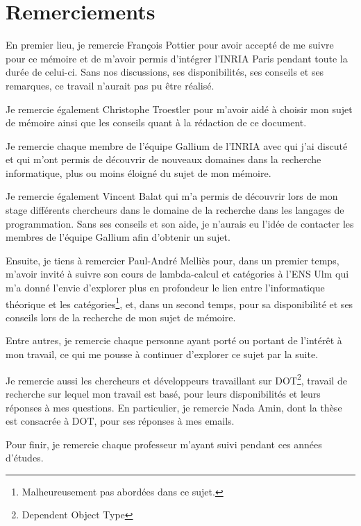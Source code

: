 \chapter*{Remerciements}

En premier lieu, je remercie François Pottier pour avoir accepté de me suivre
pour ce mémoire et de m'avoir permis d'intégrer l'INRIA Paris pendant toute la
durée de celui-ci. Sans nos discussions, ses disponibilités, ses conseils et ses
remarques, ce travail n'aurait pas pu être réalisé.

Je remercie également Christophe Troestler pour m'avoir aidé à choisir mon sujet
de mémoire ainsi que les conseils quant à la rédaction de ce document.

Je remercie chaque membre de l'équipe Gallium de
l'INRIA avec qui j'ai discuté et qui m'ont permis de découvrir de nouveaux
domaines dans la recherche informatique, plus ou moins éloigné du sujet de mon mémoire.

Je remercie également Vincent Balat qui m'a permis de découvrir lors de mon
stage différents chercheurs dans le domaine de la recherche dans les langages de
programmation. Sans ses conseils et son aide, je n'aurais eu l'idée de contacter
les membres de l'équipe Gallium afin d'obtenir un sujet.

Ensuite, je tiens à remercier Paul-André Melliès pour, dans un premier temps,
m'avoir invité à suivre son cours de lambda-calcul et catégories à l'ENS Ulm qui
m'a donné l'envie d'explorer plus en profondeur le lien entre l'informatique
théorique et les catégories\footnote{Malheureusement pas abordées dans ce sujet.}, et,
dans un second temps, pour sa disponibilité et ses conseils lors de la recherche
de mon sujet de mémoire.

Entre autres, je remercie chaque personne ayant porté ou portant de l'intérêt à mon
travail, ce qui me pousse à continuer d'explorer ce sujet par la suite.

Je remercie aussi les chercheurs et développeurs travaillant sur
DOT\footnote{Dependent Object Type}, travail de recherche sur lequel mon travail
est basé, pour leurs disponibilités et leurs réponses à mes questions. En
particulier, je remercie Nada Amin, dont la thèse est consacrée à DOT, pour ses
réponses à mes emails.

Pour finir, je remercie chaque professeur m'ayant suivi pendant ces années
d'études.